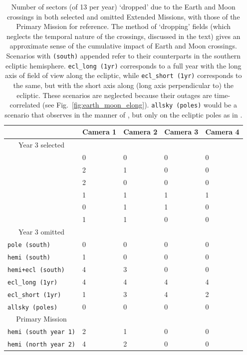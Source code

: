 \begin{table}[!tb]
	\centering
	\begin{tabular}{ | l | l | l | l | l | }
		\hline
		\ & Camera 1 & Camera 2 & Camera 3 & Camera 4 \\ \hline
		\multicolumn{1}{|c|}{Year 3 selected} & \  & \  & \  & \  \\ \hline
		\npole & 0 & 0 & 0 & 0 \\ \hline
		\nhemi & 2 & 1 & 0 & 0 \\ \hline
		\shemiAvoid & 2 & 0 & 0 & 0 \\ \hline
		\elong & 1 & 1 & 1 & 1 \\ \hline
		\eshort & 0 & 1 & 1 & 0 \\ \hline
		\hemis & 1 & 1 & 0 & 0 \\ \hline
		\multicolumn{1}{|c|}{Year 3 omitted} & \  & \  & \  & \  \\ \hline
		\texttt{pole\,(south)}  & 0 & 0 & 0 & 0 \\ \hline
		\texttt{hemi\,(south)} & 1 & 0 & 0 & 0 \\ \hline
		\texttt{hemi+ecl\,(south)} & 4 & 3 & 0 & 0 \\ \hline
		\texttt{ecl\_long\,(1yr)} & 4 & 4 & 4 & 4 \\ \hline
		\texttt{ecl\_short\,(1yr)} & 1 & 3 & 4 & 2 \\ \hline
		\texttt{allsky\,(poles)} & 0 & 0 & 0 & 0 \\ \hline
		\multicolumn{1}{|c|}{Primary Mission} & \  & \  & \  & \  \\ \hline
		\texttt{hemi\,(south year 1)} & 2 & 1 & 0 & 0 \\ \hline
		\texttt{hemi\,(north year 2)} & 4 & 2 & 0 & 0 \\ \hline
	\end{tabular}
	\caption{Number of sectors (of 13 per year) `dropped' due to the Earth and 
	Moon crossings in both selected and omitted Extended Missions, with those 
	of the Primary Mission for reference. The method of `dropping' fields 
	(which neglects the temporal nature of the crossings, discussed in the 
	text) gives an approximate sense of the cumulative impact of Earth and Moon 
	crossings. 
		Scenarios with \texttt{(south)} appended refer to their counterparts in the southern ecliptic hemisphere.
		\texttt{ecl\_long\,(1yr)} corresponds to a full year with the long axis 
		of \tesss field of view along the ecliptic, while 
		\texttt{ecl\_short\,(1yr)} corresponds to the same, but with the short 
		axis along (long axis perpendicular to) the ecliptic. These scenarios 
		are neglected because their outages are time-correlated (see 
		Fig.~\protect\ref{fig:earth_moon_elong}).
		\texttt{allsky\,(poles)} would be a scenario that observes in the manner of \hemis, but only on the ecliptic poles as in \npole.}
	\label{tab:dropped_fields}
\end{table}


